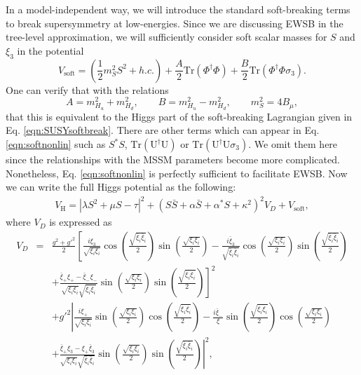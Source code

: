 In a model-independent way, we will introduce the standard soft-breaking terms to break supersymmetry at low-energies. Since we are discussing EWSB in the tree-level approximation, we will sufficiently consider soft scalar masses for $S$ and $\xi_3$ in the potential
\begin{equation}
V_{\text{soft}}= \left(\frac{1}{2}m^2_S S^2 + {h.c.}\right)+\frac{A}{2}{ \text{Tr}}\left(\Phi^{\dagger}\Phi\right)+\frac{B}{2}{\text{Tr}}\left(\Phi^{\dagger}\Phi\sigma_3\right).
\label{eqn:softnonlin}
\end{equation}
One can verify that with the relations
\begin{equation}
A=m_{H_u}^2+m_{H_d}^2, \qquad B=m_{H_u}^2-m_{H_d}^2, \qquad m_S^2= 4B_{\mu}, 
\end{equation}
that this is equivalent to the Higgs part of the soft-breaking Lagrangian given in Eq. \ref{eqn:SUSYsoftbreak}.
There are other terms which can appear in Eq. \ref{eqn:softnonlin} such as $S^{*}S$, $\text{Tr}(\text{U}^{\dagger}\text{U})$ or $\text{Tr}(\text{U}^{\dagger}\text{U}\sigma_3)$. We omit them here since the relationships with the MSSM parameters become more complicated. Nonetheless, Eq. \ref{eqn:softnonlin} is perfectly sufficient to facilitate EWSB. Now we can write the full Higgs potential as the following:
\begin{eqnarray}
V_{\text{H}}=	\left|\lambda S^{2}+\mu S-\tau\right|^{2} + \left(S\bar{S}+\alpha\bar{S}+\alpha^{*}S+\kappa^{2}\right)^{2}V_{D}+V_{\text{soft}},
\label{eqn:Vh}
\end{eqnarray}
where $V_D$ is expressed as
\begin{eqnarray}
V_D &=& \frac{g^2+g'^2}{2} \left[ \frac{i\xi_3}{\sqrt{\xi_i \xi_i}}\cos \left( \frac{\sqrt{\bar{\xi}_i \bar{\xi}_i}}{2}\right)\sin \left( \frac{\sqrt{\xi_i \xi_i}}{2}\right) - \frac{i\bar{\xi}_3}{\sqrt{\bar{\xi}_i \bar{\xi}_i}}\cos \left( \frac{\sqrt{\xi_i \xi_i}}{2}\right)\sin \left( \frac{\sqrt{\bar{\xi}_i \bar{\xi}_i}}{2}\right) \right. \nonumber \\
&&\left. +\frac{\bar{\xi}_+ \xi_+ - \bar{\xi}_- \xi_-}{\sqrt{\xi_i \xi_i} \sqrt{\bar{\xi}_i \bar{\xi}_i}} \sin \left( \frac{\sqrt{\xi_i \xi_i}}{2}\right)\sin \left( \frac{\sqrt{\bar{\xi}_i \bar{\xi}_i}}{2}\right) \right]^2 \nonumber \\
&&+g'^2 \left| \frac{i\xi_+}{\sqrt{\xi_i \xi_i}}\sin \left( \frac{\sqrt{\xi_i \xi_i}}{2}\right)\cos \left( \frac{\sqrt{\bar{\xi}_i \bar{\xi}_i}}{2}\right) 
-\frac{i\bar{\xi}_-}{\xi}\sin \left( \frac{\sqrt{\bar{\xi}_i \bar{\xi}_i}}{2}\right)\cos \left( \frac{\sqrt{\xi_i \xi_i}}{2}\right) \right. \nonumber \\
&&\left. +\frac{\bar{\xi}_+ \xi_3 - \xi_+ \bar{\xi}_3}{\sqrt{\xi_i \xi_i} \sqrt{\bar{\xi}_i \bar{\xi}_i}} \sin \left( \frac{\sqrt{\xi_i \xi_i}}{2}\right)\sin \left( \frac{\sqrt{\bar{\xi}_i \bar{\xi}_i}}{2}\right) \right|^2,
\end{eqnarray}
